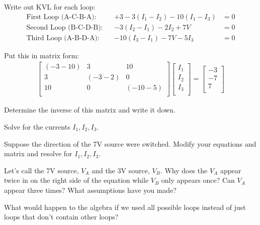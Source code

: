 Write out KVL for each loop:
\begin{align*}
\text{First Loop (A-C-B-A):}&&+3-3(I_1-I_2)-10(I_1-I_3)&=0\\
\text{Second Loop (B-C-D-B):}&&-3(I_2-I_1)-2I_2+7V&=0\\
\text{Third Loop (A-B-D-A):}&&-10(I_3-I_1)-7V-5I_3&=0
\end{align*}

Put this in matrix form:
\begin{align}
\left[ \begin{matrix}
(-3-10)&	3&	10\\
3&	(-3-2)&0\\
10	&	0&	(-10-5)\\
\end{matrix} \right]
\left[ \begin{matrix}
I_1\\
I_2\\
I_3\\
\end{matrix} \right] =
\left[ \begin{matrix}
-3\\
-7\\
7\\
\end{matrix} \right]
\end{align}

\begin{blevel}
Determine the inverse of this matrix and write it down.
\end{blevel}

\begin{clevel}
Solve for the currents $I_1,I_2,I_3$.
\end{clevel}

\begin{clevel}
Suppose the direction of the 7V source were switched. Modify your equations and matrix and resolve for $I_1,I_2,I_3$.
\end{clevel}

\begin{dlevel}
Let's call the 7V source, $V_A$ and the 3V source, $V_B$. Why does the $V_A$ appear twice in on the right side of the equation while $V_B$ only appears once? Can $V_A$ appear three times? What assumptions have you made?
\end{dlevel}

\begin{dlevel}
What would happen to the algebra if we used all possible loops instead of just loops that don't contain other loops?
\end{dlevel}

